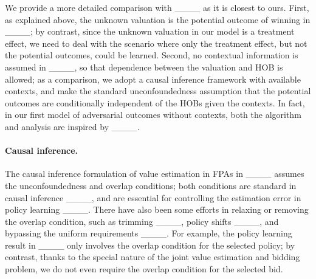 We provide a more detailed comparison with ____ as it is closest to ours. First, as explained above, the unknown valuation is the potential outcome of winning in ____; by contrast, since the unknown valuation in our model is a treatment effect, we need to deal with the scenario where only the treatment effect, but not the potential outcomes, could be learned. Second, no contextual information is assumed in ____, so that dependence between the valuation and HOB is allowed; as a comparison, we adopt a causal inference framework with available contexts, and make the standard unconfoundedness assumption that the potential outcomes are conditionally independent of the HOBs given the contexts. In fact, in our first model of adversarial outcomes without contexts, both the algorithm and analysis are inspired by ____.  

\paragraph{Causal inference.} The causal inference formulation of value estimation in FPAs in ____ assumes the unconfoundedness and overlap conditions; both conditions are standard in causal inference ____, and are essential for controlling the estimation error in policy learning ____. There have also been some efforts in relaxing or removing the overlap condition, such as trimming ____, policy shifts ____, and bypassing the uniform requirements ____. For example, the policy learning result in ____ only involves the overlap condition for the selected policy; by contrast, thanks to the special nature of the joint value estimation and bidding problem, we do not even require the overlap condition for the selected bid.